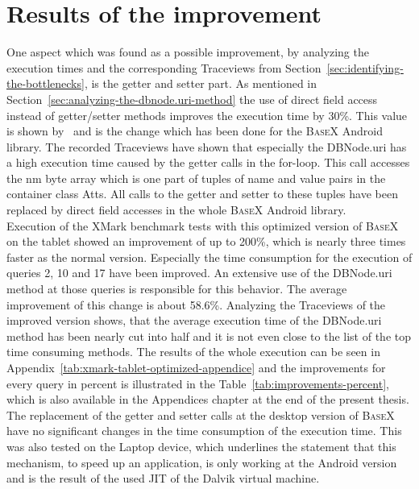 \section{Results of the improvement}
\label{sec:improving}
One aspect which was found as a possible improvement, by analyzing the execution times and the corresponding Traceviews from Section~\ref{sec:identifying-the-bottlenecks}, is the getter and setter part.
As mentioned in Section~\ref{sec:analyzing-the-dbnode.uri-method} the use of direct field access instead of getter/setter methods improves the execution time by 30\%.
This value is shown by~\cite{toninievlautatingandroid} and is the change which has been done for the \textsc{BaseX} Android library.
The recorded Traceviews have shown that especially the \textsf{DBNode.uri} has a high execution time caused by the getter calls in the for-loop.
This call accesses the \textsf{nm} byte array which is one part of tuples of name and value pairs in the container class \textsf{Atts}.
All calls to the getter and setter to these tuples have been replaced by direct field accesses in the whole \textsc{BaseX} Android library.\\
Execution of the XMark benchmark tests with this optimized version of \textsc{BaseX} on the tablet showed an improvement of up to 200\%, which is nearly three times faster as the normal version.
Especially the time consumption for the execution of queries 2, 10 and 17 have been improved.
An extensive use of the \textsf{DBNode.uri} method at those queries is responsible for this behavior.
The average improvement of this change is about 58.6\%.
Analyzing the Traceviews of the improved version shows, that the average execution time of the \textsf{DBNode.uri} method has been nearly cut into half and it is not even close to the list of the top time consuming methods.
The results of the whole execution can be seen in Appendix~\ref{tab:xmark-tablet-optimized-appendice} and the improvements for every query in percent is illustrated in the Table~\ref{tab:improvements-percent}, which is also available in the Appendices chapter at the end of the present thesis.\\
The replacement of the getter and setter calls at the desktop version of \textsc{BaseX} have no significant changes in the time consumption of the execution time.
This was also tested on the Laptop device, which underlines the statement that this mechanism, to speed up an application, is only working at the Android version and is the result of the used JIT of the Dalvik virtual machine.
